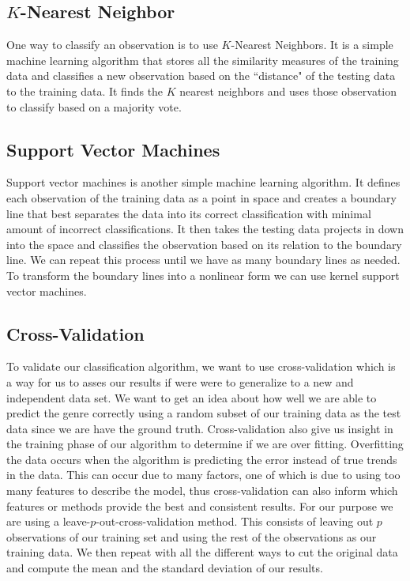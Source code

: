 \documentclass[12pt]{article}
\begin{document}
\subsection{$K$-Nearest Neighbor}
One way to classify an observation is to use $K$-Nearest Neighbors. It is a simple machine learning algorithm that stores all the similarity measures of the training data and classifies a new observation based on the ``distance" of the testing data to the training data. It finds the  $K$ nearest neighbors and uses those observation to classify based on a majority vote. 

\subsection{Support Vector Machines}
Support vector machines is another simple machine learning algorithm. It defines each observation of the training data as a point in space and creates a boundary line that best separates the data into its correct classification with minimal amount of incorrect classifications. It then takes the testing data projects in down into the space and classifies the observation based on its relation to the boundary line. We can repeat this process until we have as many boundary lines as needed. To transform the boundary lines into a nonlinear form we can use kernel support vector machines.

\subsection{Cross-Validation}


To validate our classification algorithm, we want to use cross-validation which is a way for us to asses our results if were were to generalize to a new and independent data set. We want to get an idea about how well we are able to predict the genre correctly using a random subset of our training data as the test data since we are have the ground truth. Cross-validation also give us insight in the training phase of our algorithm to determine if we are over fitting. Overfitting the data occurs when the algorithm is predicting the error instead of true trends in the data. This can occur due to many factors, one of which is due to using too many features to describe the model, thus cross-validation can also inform which features or methods provide the best and consistent results. For our purpose we are using a leave-$p$-out-cross-validation method. This consists of leaving out $p$ observations of our training set and using the rest of the observations as our training data. We then repeat with all the different ways to cut the original data and compute the mean and the standard deviation of our results.
\end{document}
